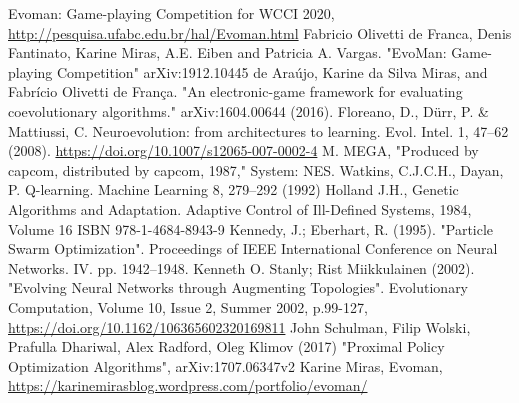 \documentclass[conference]{IEEEtran}
\begin{document}
    \begin{thebibliography}{00}
         Evoman: Game-playing Competition for WCCI 2020, \url{http://pesquisa.ufabc.edu.br/hal/Evoman.html}
         Fabricio Olivetti de Franca, Denis Fantinato, Karine Miras, A.E. Eiben and Patricia A. Vargas.
        "EvoMan: Game-playing Competition" arXiv:1912.10445
         de Araújo, Karine da Silva Miras, and Fabrício Olivetti de França.
        "An electronic-game framework for evaluating coevolutionary algorithms." arXiv:1604.00644 (2016).
         Floreano, D., Dürr, P. & Mattiussi, C. Neuroevolution: from architectures to learning. Evol. Intel. 1, 47–62 (2008). \url{https://doi.org/10.1007/s12065-007-0002-4}
         M. MEGA, "Produced by capcom, distributed by capcom, 1987," System: NES.
         Watkins, C.J.C.H., Dayan, P. Q-learning. Machine Learning 8, 279–292 (1992)
         Holland J.H., Genetic Algorithms and Adaptation. Adaptive Control of Ill-Defined Systems, 1984, Volume 16 ISBN 978-1-4684-8943-9
         Kennedy, J.; Eberhart, R. (1995). "Particle Swarm Optimization". Proceedings of IEEE International Conference on Neural Networks. IV. pp. 1942–1948.
         Kenneth O. Stanly; Rist Miikkulainen (2002). "Evolving Neural Networks through Augmenting Topologies". Evolutionary Computation, Volume 10, Issue 2, Summer 2002, p.99-127, \url{https://doi.org/10.1162/106365602320169811}
         John Schulman, Filip Wolski, Prafulla Dhariwal, Alex Radford, Oleg Klimov (2017) "Proximal Policy Optimization Algorithms", arXiv:1707.06347v2
         Karine Miras, Evoman, \url{https://karinemirasblog.wordpress.com/portfolio/evoman/}
    \end{thebibliography}
\end{document}
